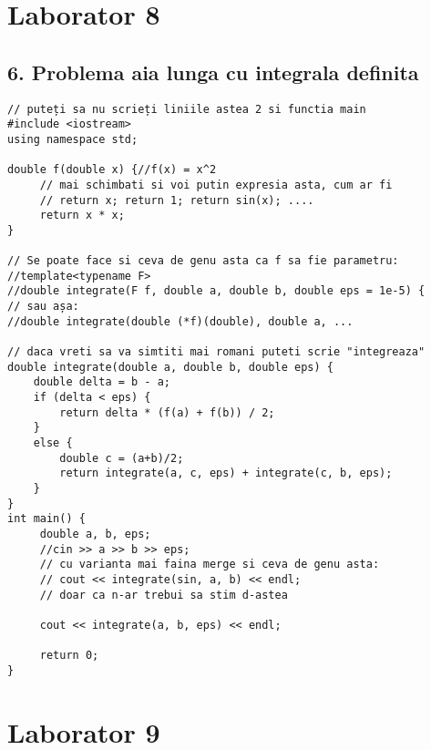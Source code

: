 \documentclass[11pt]{article}
\begin{document}
\pagebreak
\section*{Laborator 8}
\label{sec:org63cd70a}
\subsection*{6. Problema aia lunga cu integrala definita}
\label{sec:orga05ad32}
\begin{verbatim}
// puteți sa nu scrieți liniile astea 2 si functia main
#include <iostream>
using namespace std;

double f(double x) {//f(x) = x^2
     // mai schimbati si voi putin expresia asta, cum ar fi 
     // return x; return 1; return sin(x); ....
     return x * x;
}

// Se poate face si ceva de genu asta ca f sa fie parametru:
//template<typename F>
//double integrate(F f, double a, double b, double eps = 1e-5) {
// sau așa:
//double integrate(double (*f)(double), double a, ...

// daca vreti sa va simtiti mai romani puteti scrie "integreaza"
double integrate(double a, double b, double eps) {
    double delta = b - a;
    if (delta < eps) {
        return delta * (f(a) + f(b)) / 2;
    }
    else {
        double c = (a+b)/2;
        return integrate(a, c, eps) + integrate(c, b, eps);
    }
}
int main() {
     double a, b, eps;
     //cin >> a >> b >> eps;
     // cu varianta mai faina merge si ceva de genu asta:
     // cout << integrate(sin, a, b) << endl;
     // doar ca n-ar trebui sa stim d-astea

     cout << integrate(a, b, eps) << endl;

     return 0;
}
\end{verbatim}
\pagebreak

\section*{Laborator 9}
\label{sec:org23647ad}
\end{document}
